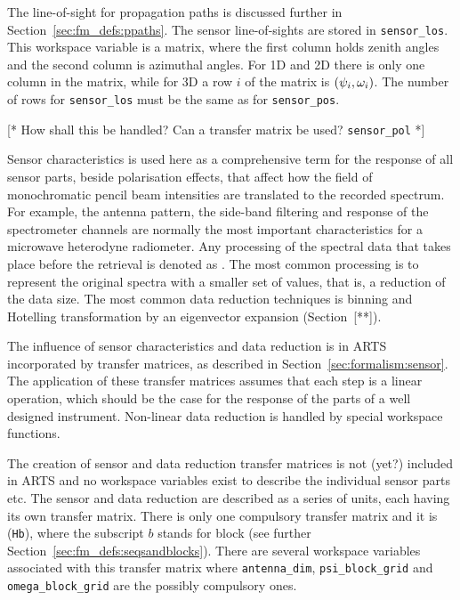 The line-of-sight for propagation paths is discussed further in
Section~\ref{sec:fm_defs:ppaths}. The sensor line-of-sights are stored in
\verb|sensor_los|. This workspace variable is a matrix, where the
first column holds zenith angles and the second column is azimuthal
angles. For 1D and 2D there is only one column in the matrix, while
for 3D a row $i$ of the matrix is $(\psi_{i},\omega_{i})$. The
number of rows for \verb|sensor_los| must be the same as for
\verb|sensor_pos|.


\label{sec:fm_defs:sensorpol}

[* How shall this be handled? Can a transfer matrix be used?
\verb|sensor_pol| *]


\label{sec:fm_defs:sensorchar}

Sensor characteristics is used here as a
comprehensive term for the response of all sensor parts, beside
polarisation effects, that affect how the field of monochromatic
pencil beam intensities are translated to the recorded spectrum. For
example, the antenna pattern, the side-band filtering and response of
the spectrometer channels are normally the most important
characteristics for a microwave heterodyne radiometer. Any processing
of the spectral data that takes place before the retrieval is denoted
as . The most common processing is to represent
the original spectra with a smaller set of values, that is, a
reduction of the data size. The most common data reduction techniques
is binning and Hotelling transformation by an eigenvector expansion
(Section~[**]).

The influence of sensor characteristics and data reduction is in ARTS
incorporated by transfer matrices, as
described in Section~\ref{sec:formalism:sensor}. The application of
these transfer matrices assumes that each step is a linear operation,
which should be the case for the response of the parts of a well
designed instrument. Non-linear data reduction is handled by special
workspace functions.

The creation of sensor and data reduction transfer matrices is not
(yet?) included in ARTS and no workspace variables exist to describe
the individual sensor parts etc. The sensor and data reduction are
described as a series of units, each having its own transfer matrix.
There is only one compulsory transfer matrix and it is 
(\verb|Hb|), where the subscript $b$ stands for block (see further
Section~\ref{sec:fm_defs:seqsandblocks}). There are several workspace
variables associated with this transfer matrix where
\verb|antenna_dim|, \verb|psi_block_grid| and \verb|omega_block_grid|
are the possibly compulsory ones.

